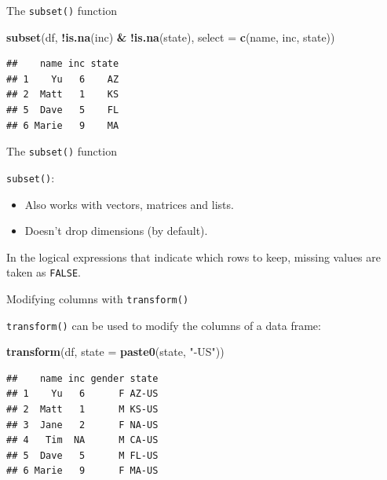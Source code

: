 \documentclass[ignorenonframetext,]{beamer}
\newenvironment{Shaded}{\begin{snugshade}}{\end{snugshade}}
\newcommand{\DataTypeTok}[1]{\textcolor[rgb]{0.13,0.29,0.53}{#1}}
\newcommand{\KeywordTok}[1]{\textcolor[rgb]{0.13,0.29,0.53}{\textbf{#1}}}
\newcommand{\NormalTok}[1]{#1}
\newcommand{\OperatorTok}[1]{\textcolor[rgb]{0.81,0.36,0.00}{\textbf{#1}}}
\newcommand{\StringTok}[1]{\textcolor[rgb]{0.31,0.60,0.02}{#1}}
\providecommand{\tightlist}{%
  \setlength{\itemsep}{0pt}\setlength{\parskip}{0pt}}
\begin{document}
\begin{frame}[fragile]{The \texttt{subset()} function}
\protect\hypertarget{the-subset-function-7}{}

\begin{Shaded}
\begin{Highlighting}[]
\KeywordTok{subset}\NormalTok{(df, }\OperatorTok{!}\KeywordTok{is.na}\NormalTok{(inc) }\OperatorTok{&}\StringTok{ }\OperatorTok{!}\KeywordTok{is.na}\NormalTok{(state), }
       \DataTypeTok{select =} \KeywordTok{c}\NormalTok{(name, inc, state))}
\end{Highlighting}
\end{Shaded}

\begin{verbatim}
##    name inc state
## 1    Yu   6    AZ
## 2  Matt   1    KS
## 5  Dave   5    FL
## 6 Marie   9    MA
\end{verbatim}

\end{frame}

\begin{frame}[fragile]{The \texttt{subset()} function}
\protect\hypertarget{the-subset-function-8}{}

\texttt{subset()}:

\begin{itemize}
\tightlist
\item
  Also works with vectors, matrices and lists.
\item
  Doesn't drop dimensions (by default).
\end{itemize}

In the logical expressions that indicate which rows to keep, missing
values are taken as \texttt{FALSE}.

\end{frame}

\begin{frame}[fragile]{Modifying columns with \texttt{transform()}}
\protect\hypertarget{modifying-columns-with-transform}{}

\texttt{transform()} can be used to modify the columns of a data frame:

\begin{Shaded}
\begin{Highlighting}[]
\KeywordTok{transform}\NormalTok{(df, }\DataTypeTok{state =} \KeywordTok{paste0}\NormalTok{(state, }\StringTok{"-US"}\NormalTok{))}
\end{Highlighting}
\end{Shaded}

\begin{verbatim}
##    name inc gender state
## 1    Yu   6      F AZ-US
## 2  Matt   1      M KS-US
## 3  Jane   2      F NA-US
## 4   Tim  NA      M CA-US
## 5  Dave   5      M FL-US
## 6 Marie   9      F MA-US
\end{verbatim}

\end{frame}
\end{document}
